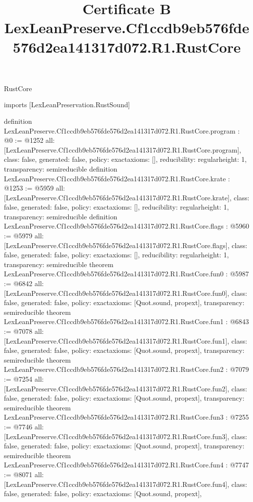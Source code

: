 \begin{lexlean}{RustCore}
\title{Certificate B LexLeanPreserve.Cf1ccdb9eb576fde576d2ea141317d072.R1.RustCore}
\begin{coremodule}
imports [LexLeanPreservation.RustSound]

definition LexLeanPreserve.Cf1ccdb9eb576fde576d2ea141317d072.R1.RustCore.program : @0 := @1252 {
  all: [LexLeanPreserve.Cf1ccdb9eb576fde576d2ea141317d072.R1.RustCore.program],
  class: false,
  generated: false,
  policy: exact{axioms: []},
  reducibility: regular{height: 1},
  transparency: semireducible
}
definition LexLeanPreserve.Cf1ccdb9eb576fde576d2ea141317d072.R1.RustCore.krate : @1253 := @5959 {
  all: [LexLeanPreserve.Cf1ccdb9eb576fde576d2ea141317d072.R1.RustCore.krate],
  class: false,
  generated: false,
  policy: exact{axioms: []},
  reducibility: regular{height: 1},
  transparency: semireducible
}
definition LexLeanPreserve.Cf1ccdb9eb576fde576d2ea141317d072.R1.RustCore.flags : @5960 := @5979 {
  all: [LexLeanPreserve.Cf1ccdb9eb576fde576d2ea141317d072.R1.RustCore.flags],
  class: false,
  generated: false,
  policy: exact{axioms: []},
  reducibility: regular{height: 1},
  transparency: semireducible
}
theorem LexLeanPreserve.Cf1ccdb9eb576fde576d2ea141317d072.R1.RustCore.fun0 : @5987 := @6842 {
  all: [LexLeanPreserve.Cf1ccdb9eb576fde576d2ea141317d072.R1.RustCore.fun0],
  class: false,
  generated: false,
  policy: exact{axioms: [Quot.sound, propext]},
  transparency: semireducible
}
theorem LexLeanPreserve.Cf1ccdb9eb576fde576d2ea141317d072.R1.RustCore.fun1 : @6843 := @7078 {
  all: [LexLeanPreserve.Cf1ccdb9eb576fde576d2ea141317d072.R1.RustCore.fun1],
  class: false,
  generated: false,
  policy: exact{axioms: [Quot.sound, propext]},
  transparency: semireducible
}
theorem LexLeanPreserve.Cf1ccdb9eb576fde576d2ea141317d072.R1.RustCore.fun2 : @7079 := @7254 {
  all: [LexLeanPreserve.Cf1ccdb9eb576fde576d2ea141317d072.R1.RustCore.fun2],
  class: false,
  generated: false,
  policy: exact{axioms: [Quot.sound, propext]},
  transparency: semireducible
}
theorem LexLeanPreserve.Cf1ccdb9eb576fde576d2ea141317d072.R1.RustCore.fun3 : @7255 := @7746 {
  all: [LexLeanPreserve.Cf1ccdb9eb576fde576d2ea141317d072.R1.RustCore.fun3],
  class: false,
  generated: false,
  policy: exact{axioms: [Quot.sound, propext]},
  transparency: semireducible
}
theorem LexLeanPreserve.Cf1ccdb9eb576fde576d2ea141317d072.R1.RustCore.fun4 : @7747 := @8071 {
  all: [LexLeanPreserve.Cf1ccdb9eb576fde576d2ea141317d072.R1.RustCore.fun4],
  class: false,
  generated: false,
  policy: exact{axioms: [Quot.sound, propext]},
}
\end{coremodule}
\end{lexlean}
